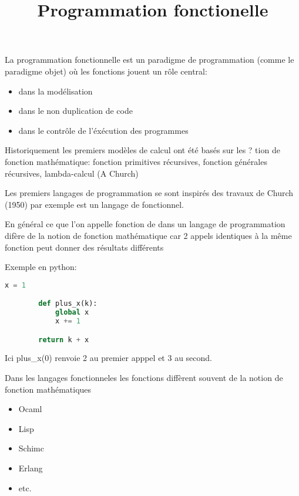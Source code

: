 \documentclass{article}
\title{Programmation fonctionelle}
\begin{document}
    La programmation fonctionnelle est un paradigme de programmation (comme le paradigme objet) où les fonctions jouent un rôle central:

    \begin{itemize}
        \item dans la modélisation
        \item dans le non duplication de code
        \item dans le contrôle de l'éxécution des programmes
    \end{itemize}

    Historiquement les premiers modèles de calcul ont été basés sur les ? tion de fonction mathématique: fonction primitives récursives, fonction générales récursives,
    lambda-calcul (A Church)

    Les premiers langages de programmation se sont inspirés des travaux de Church (1950) par exemple est un langage de fonctionnel.

    En général  ce que l'on appelle fonction de dans un langage de programmation difère de la notion de fonction mathématique car 2 appels identiques à la même fonction
    peut donner des résultats différents

    Exemple en python:
    \begin{lstlisting}[language=Python]
        x = 1

        def plus_x(k):
            global x
            x += 1

        return k + x
    \end{lstlisting}

    Ici plus\_x(0) renvoie 2 au premier apppel et 3 au second.

    Dans les langages fonctionneles les fonctions diffèrent souvent de la notion de fonction mathématiques
    \begin{itemize}
        \item Ocaml
        \item Lisp
        \item Schimc
        \item Erlang
        \item etc.
    \end{itemize}
\end{document}
